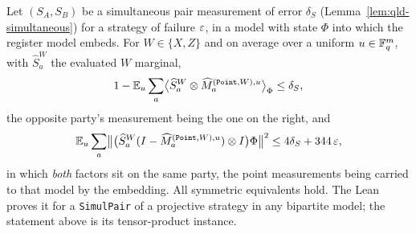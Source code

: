 \effortMedium

\begin{lemma}
\label{lem:qld-helper}
\leanok
Let $(S_A, S_B)$ be a simultaneous pair measurement of error $\delta_S$
(Lemma~\ref{lem:qld-simultaneous}) for a strategy of failure $\varepsilon$, in a model with state $\Phi$
into which the register model embeds. For $W \in \{X, Z\}$ and on
average over a uniform $u \in \mathbb{F}_q^m$, with $\widehat S^W_a$ the evaluated $W$ marginal,
\begin{equation*}
  1 - \mathbb E_u \sum_a \bigl\langle \widehat{S}^W_a \otimes
    \widehat{M}^{(\mathtt{Point}, W), u}_{a} \bigr\rangle_\Phi \leq \delta_S ,
\end{equation*}
the opposite party's measurement being the one on the right, and
\begin{equation*}
  \mathbb E_u \sum_a \bigl\| \bigl( \widehat{S}^W_a
    ( I - \widehat{M}^{(\mathtt{Point}, W), u}_{a} ) \otimes I \bigr) \Phi \bigr\|^2
  \leq 4 \delta_S + 344\,\varepsilon ,
\end{equation*}
in which \emph{both} factors sit on the same party, the point measurements being carried to that
model by the embedding. All symmetric equivalents hold. The Lean proves it for a \texttt{SimulPair}
of a projective strategy in any bipartite model; the statement above is its tensor-product
instance.
\end{lemma}

